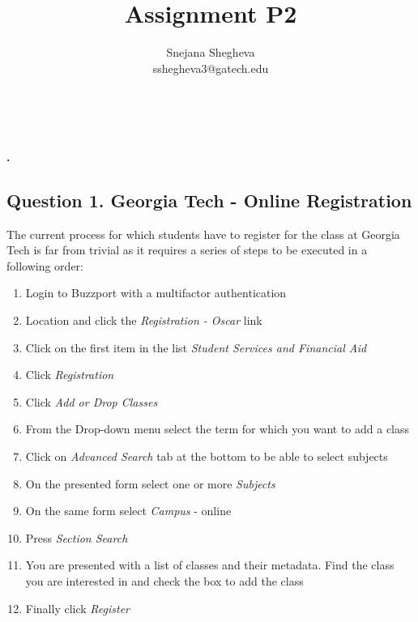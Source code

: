 \documentclass[12pt,letterpaper]{article}
\makeatletter
\renewcommand{\maketitle}{\bgroup
   \begin{center}
   \textbf{{\fontsize{18pt}{20}\selectfont \@title}}\\
   \vspace{10pt}
   {\fontsize{12pt}{0}\selectfont \@author} 
   \end{center}
}
\newenvironment{myquote}[1]%
  {\list{}{\leftmargin=#1\rightmargin=#1}\item[]}%
  {\endlist}
\renewenvironment{abstract}
{\vspace*{-.5in}\fontsize{12pt}{12}\begin{myquote}{.5in}
\noindent \par{\bfseries \abstractname.}}
{\medskip\noindent
\end{myquote}
}
\makeatother
\begin{document}
\title{Assignment P2}
\author{Snejana Shegheva \\ sshegheva3@gatech.edu}

\maketitle
\thispagestyle{fancy}

\begin{abstract}
 
\end{abstract}

\subsection*{Question 1. Georgia Tech - Online Registration}
The current process for which students have to register for the class at Georgia Tech is far from trivial as it requires a series of steps to be executed in a following order:

\begin{enumerate}
    \item Login to Buzzport with a multifactor authentication
    \item Location and click the \textit{Registration - Oscar} link 
    \item Click on the first item in the list \textit{Student Services and Financial Aid}
    \item Click \textit{Registration}
    \item Click \textit{Add or Drop Classes}
    \item From the Drop-down menu select the term for which you want to add a class
    \item Click on \textit{Advanced Search} tab at the bottom to be able to select subjects
    \item On the presented form select one or more \textit{Subjects}
    \item On the same form select \textit{Campus} - online
    \item Press \textit{Section Search}
    \item You are presented with a list of classes and their metadata. Find the class you are interested in and check the box to add the class
    \item Finally click \textit{Register}
\end{enumerate}
\end{document}
